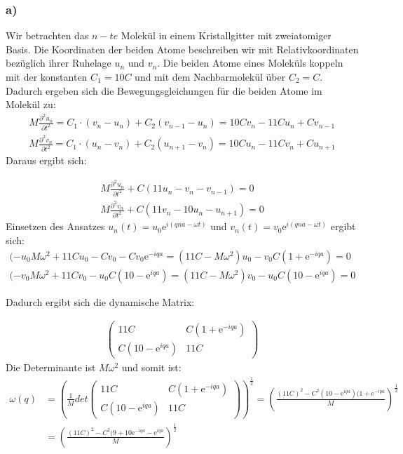 \documentclass[11pt]{article}
\begin{document}
\subsubsection*{a)}
Wir betrachten das $n-te$ Molekül in einem Kristallgitter mit zweiatomiger Basis. Die Koordinaten der beiden Atome beschreiben wir mit Relativkoordinaten bezüglich ihrer Ruhelage $u_n$ und $v_n$. Die beiden Atome eines Moleküls koppeln mit der konstanten $C_1 = 10C$ und mit dem Nachbarmolekül über $C_2 = C$. Dadurch ergeben sich die Bewegungsgleichungen für die beiden Atome im Molekül zu:
\begin{align*}
M\frac{\partial^2 u_n}{\partial t^2} = C_1\cdot (v_n-u_n)+C_2(v_{n-1}-u_n)=10Cv_n-11Cu_n+Cv_{n-1}\\
M\frac{\partial^2 v_n}{\partial t^2} = C_1\cdot (u_n-v_n)+C_2(u_{n+1}-v_n) = 10Cu_n-11Cv_n+Cu_{n+1}
\end{align*}
Daraus ergibt sich:

\begin{align*}
M\frac{\partial^2 u_n}{\partial t^2}+C(11u_n-v_n-v_{n-1})=0\\
M\frac{\partial^2 v_n}{\partial t^2}+C(11v_n-10u_n-u_{n+1})=0
\end{align*}
Einsetzen des Ansatzes $u_n(t)=u_0\mathrm{e}^{i(qna-\omega t)}$ und $v_n(t)=v_0\mathrm{e}^{i(qna-\omega t)}$ ergibt sich:
\begin{align*}
(-u_0M\omega^2+11Cu_0-Cv_0-Cv_0\mathrm{e}^{-iqa}=(11C-M\omega^2)u_0-v_0C(1+\mathrm{e}^{-iqa})=0\\
(-v_0M\omega^2+11Cv_0-u_0C(10-\mathrm{e}^{iqa})=(11C-M\omega^2)v_0-u_0C(10-\mathrm{e}^{iqa})=0
\end{align*}

Dadurch ergibt sich die dynamische Matrix:

\begin{align*}
\begin{pmatrix}
11C & C(1+\mathrm{e}^{-iqa})\\
C(10-\mathrm{e}^{iqa}) & 11C
\end{pmatrix}
\end{align*}
Die Determinante ist $M\omega^2$ und somit ist:
\begin{align*}
\omega(q)&=\left(\frac{1}{M}det\begin{pmatrix}
11C & C(1+\mathrm{e}^{-iqa})\\
C(10-\mathrm{e}^{iqa}) & 11C
\end{pmatrix}\right)^{\frac{1}{2}}
= \left(\frac{(11C)^2-C^2(10-\mathrm{e}^{iqa})(1+\mathrm{e}^{-iqa}}{M}\right)^{\frac{1}{2}}\\
&=\left(\frac{(11C)^2-C^2(9+10\mathrm{e}^{-iqa}-\mathrm{e}^{iqa}}{M}\right)^{\frac{1}{2}}
\end{align*}
\end{document}
